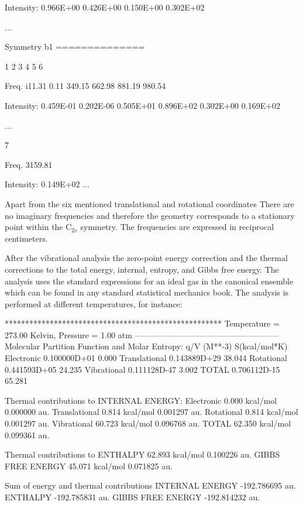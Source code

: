 \begin{sourcelisting}
       Intensity:   0.966E+00 0.426E+00 0.150E+00 0.302E+02

...

    Symmetry b1
   ==============

                         1         2         3         4         5         6

            Freq.     i11.31      0.11    349.15    662.98    881.19    980.54

       Intensity:   0.459E-01 0.202E-06 0.505E+01 0.896E+02 0.302E+00 0.169E+02

...

                         7

            Freq.    3159.81

      Intensity:   0.149E+02
...

\end{sourcelisting}

Apart from the six mentioned translational and rotational coordinates
There are no imaginary frequencies and therefore the geometry corresponds
to a stationary point within the C$_{2v}$ symmetry.
The frequencies are expressed in reciprocal centimeters.

After the vibrational analysis the zero-point energy correction and the thermal 
corrections to the total energy, internal, entropy, and Gibbs free energy.
The analysis uses the standard expressions for an ideal gas in the canonical 
ensemble which can be found in any standard statistical mechanics book.
The analysis is performed at different temperatures, for instance:
 
\begin{inputlisting}
*****************************************************
 Temperature =   273.00 Kelvin, Pressure =   1.00 atm
 -----------------------------------------------------
 Molecular Partition Function and Molar Entropy:
                        q/V (M**-3)    S(kcal/mol*K)
 Electronic            0.100000D+01        0.000
 Translational         0.143889D+29       38.044
 Rotational            0.441593D+05       24.235
 Vibrational           0.111128D-47        3.002
 TOTAL                 0.706112D-15       65.281

 Thermal contributions to INTERNAL ENERGY:
 Electronic           0.000 kcal/mol      0.000000 au.
 Translational        0.814 kcal/mol      0.001297 au.
 Rotational           0.814 kcal/mol      0.001297 au.
 Vibrational         60.723 kcal/mol      0.096768 au.
 TOTAL               62.350 kcal/mol      0.099361 au.

 Thermal contributions to
 ENTHALPY            62.893 kcal/mol      0.100226 au.
 GIBBS FREE ENERGY   45.071 kcal/mol      0.071825 au.

 Sum of energy and thermal contributions
 INTERNAL ENERGY                       -192.786695 au.
 ENTHALPY                              -192.785831 au.
 GIBBS FREE ENERGY                     -192.814232 au.
\end{inputlisting}

